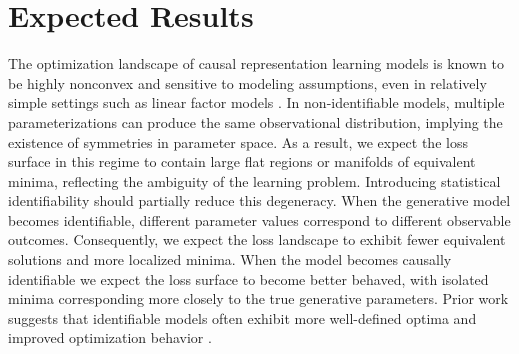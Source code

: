 \documentclass{article} %
\begin{document}
\section{Expected Results}

The optimization landscape of causal representation learning models is known to be highly nonconvex and sensitive to modeling assumptions, even in relatively simple settings such as linear factor models \cite{Moran2026CRLFramework}. In non-identifiable models, multiple parameterizations can produce the same observational distribution, implying the existence of symmetries in parameter space. As a result, we expect the loss surface in this regime to contain large flat regions or manifolds of equivalent minima, reflecting the ambiguity of the learning problem. Introducing statistical identifiability should partially reduce this degeneracy. When the generative model becomes identifiable, different parameter values correspond to different observable outcomes. Consequently, we expect the loss landscape to exhibit fewer equivalent solutions and more localized minima. When the model becomes causally identifiable we expect the loss surface to become better behaved, with isolated minima corresponding more closely to the true generative parameters. Prior work suggests that identifiable models often exhibit more well-defined optima and improved optimization behavior \cite{Moran2026CRLFramework, KwonChae2024VAE}.

\newpage



\end{document}
